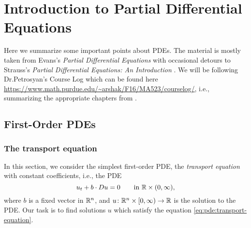 \chapter{Introduction to Partial Differential Equations}
Here we summarize some important points about PDEs. The material is mostly
taken from Evans's \emph{Partial Differential Equations} \cite{evans} with
occasional detours to Strauss's \emph{Partial Differential Equations: An
  Introduction} \cite{strauss}. We will be following Dr.\@ Petrosyan's
\textsf{Course Log} which can be found here
\url{https://www.math.purdue.edu/~arshak/F16/MA523/courselog/}, i.e.,
summarizing the appropriate chapters from \cite{evans}.

\section{First-Order PDEs}
\subsection{The transport equation}
In this section, we consider the simplest first-order PDE, the
\emph{transport equation} with constant coefficients, i.e., the PDE
\begin{equation}
  \label{eq:pde:transport-equation}
  u_t+b\cdot Du=0\qquad\text{in \(\mathbb{R}\times(0,\infty)\),}
\end{equation}
where \(b\) is a fixed vector in \(\mathbb{R}^n\), and
\(u\colon\mathbb{R}^n\times[0,\infty)\to\mathbb{R}\) is the solution to the PDE. Our
task is to find solutions \(u\) which satisfy the equation
\eqref{eq:pde:transport-equation}.




